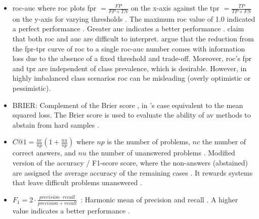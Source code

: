 \begin{itemize}
    \item \ac{roc-auc} \citep{bevendorff_overview_2024,weerasinghe_feature_vector_difference_2021,kocher_unine_2015}
    where \ac{roc} plots \ac{fpr} $= \frac{FP}{FP+TN}$ on the x-axis against the \ac{tpr} $=\frac{TP}{TP+FN}$ on the y-axis 
    for varying thresholds \citep{kocher_unine_2015,neal_surveying_2018}.
    The maximum \ac{roc} value of 1.0 indicated a perfect performance \citep{kocher_unine_2015}.
    Greater \ac{auc} indicates a better performance \citep{neal_surveying_2018}.
    \citet{kocher_unine_2015} claim that both \ac{roc} and \ac{auc} are difficult to interpret.
    \citet{llm_detection_av_2025} argue that the reduction from the \ac{fpr}-\ac{tpr} curve of \ac{roc} to a single \ac{roc-auc} number 
    comes with information loss due to the absence of a fixed threshold and trade-off.
    Moreover, \ac{roc}'s \ac{fpr} and \ac{tpr} are independent of class prevalence, which is desirable.
    However, in highly imbalanced class scenarios \ac{roc} can be misleading (overly optimistic or pessimistic).
    
    \item BRIER: Complement of the Brier score \citep{bevendorff_overview_2024,weerasinghe_feature_vector_difference_2021}, 
    in \citet{bevendorff_overview_2024}'s case equivalent to the mean squared loss.
    The Brier score is used to evaluate the ability of \ac{av} methods to abstain from hard samples \citep{tyo_state_2022}.
    
    \item $C@1 = \frac{nc}{np}(1+\frac{nu}{np})$ where $np$ is the number of problems, $nc$ the number of correct answers, 
    and $nu$ the number of unanswered problems \citep{kocher_unine_2015}. 
    Modified version of the accuracy \citep{bevendorff_overview_2024}/ F1-score \citep{weerasinghe_feature_vector_difference_2021} score, 
    where the non-answers (abstained) \citep{llm_detection_av_2025} are assigned the average accuracy of the remaining cases \citep{bevendorff_overview_2024}. 
    It rewards systems that leave difficult problems unanswered \citep{weerasinghe_feature_vector_difference_2021}.
    
    \item $F_1 = 2 \cdot \frac{precision \cdot recall}{precision + recall}$~\citep{neal_surveying_2018}: Harmonic mean of precision and recall \citep{bevendorff_overview_2024,weerasinghe_feature_vector_difference_2021}.
    A higher value indicates a better performance \citep{neal_surveying_2018}.
    

\end{itemize}
